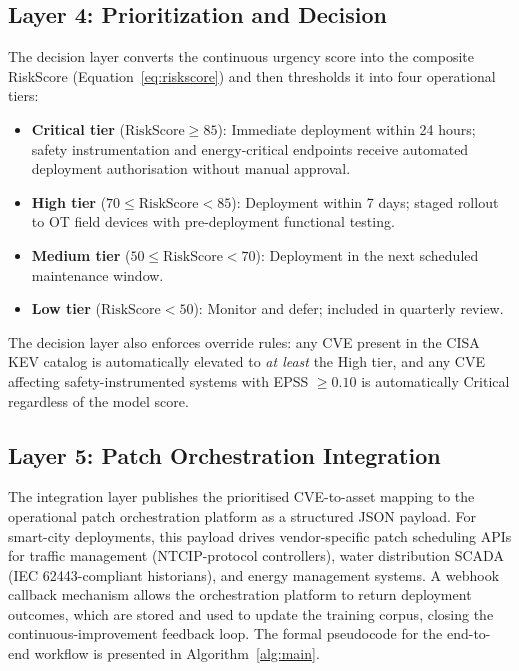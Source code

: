 \documentclass[review,12pt]{elsarticle}
\begin{document}
\subsection{Layer 4: Prioritization and Decision}

The decision layer converts the continuous urgency score into the composite RiskScore (Equation~\ref{eq:riskscore}) and then thresholds it into four operational tiers:

\begin{itemize}
  \item \textbf{Critical tier} ($\text{RiskScore} \geq 85$): Immediate deployment within 24 hours; safety instrumentation and energy-critical endpoints receive automated deployment authorisation without manual approval.
  \item \textbf{High tier} ($70 \leq \text{RiskScore} < 85$): Deployment within 7 days; staged rollout to OT field devices with pre-deployment functional testing.
  \item \textbf{Medium tier} ($50 \leq \text{RiskScore} < 70$): Deployment in the next scheduled maintenance window.
  \item \textbf{Low tier} ($\text{RiskScore} < 50$): Monitor and defer; included in quarterly review.
\end{itemize}

The decision layer also enforces override rules: any CVE present in the CISA KEV catalog is automatically elevated to \textit{at least} the High tier, and any CVE affecting safety-instrumented systems with EPSS $\geq 0.10$ is automatically Critical regardless of the model score.

\subsection{Layer 5: Patch Orchestration Integration}

The integration layer publishes the prioritised CVE-to-asset mapping to the operational patch orchestration platform as a structured JSON payload. For smart-city deployments, this payload drives vendor-specific patch scheduling APIs for traffic management (NTCIP-protocol controllers), water distribution SCADA (IEC 62443-compliant historians), and energy management systems. A webhook callback mechanism allows the orchestration platform to return deployment outcomes, which are stored and used to update the training corpus, closing the continuous-improvement feedback loop. The formal pseudocode for the end-to-end workflow is presented in Algorithm~\ref{alg:main}.
\end{document}
